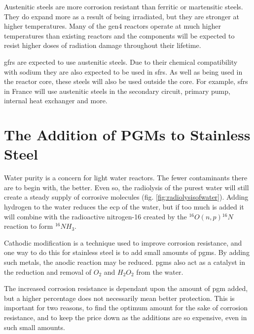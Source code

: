 Austenitic steels are more corrosion resistant than ferritic or martensitic steels.  They do expand more as a result of being irradiated, but they are stronger at higher temperatures.  Many of the \acrshort{gen4} reactors operate at much higher temperatures than existing reactors and the components will be expected to resist higher doses of radiation damage throughout their lifetime.

\acrshort{gfr}s are expected to use austenitic steels.  Due to their chemical compatibility with sodium they are also expected to be used in \acrshort{sfr}s.  As well as being used in the reactor core, these steels will also be used outside the core.  For example, \acrshort{sfr}s in France will use austenitic steels in the secondary circuit, primary pump, internal heat exchanger and more\cite{convsteelooc}.


\FloatBarrier



\section[Addition of PGMs]{The Addition of PGMs to Stainless Steel}

Water purity is a concern for light water reactors.  The fewer contaminants there are to begin with, the better.  Even so, the radiolysis of the purest water will still create a steady supply of corrosive molecules (fig. \ref{fig:radiolysisofwater}).  Adding hydrogen to the water reduces the \acrlong{ecp} of the water, but if too much is added it will combine with the radioactive nitrogen-16 created by the ${}^{16}O(n,p){}^{16}N$ reaction to form ${}^{16}NH_{3}$\cite{noblemetalchemical}.

Cathodic modification is a technique used to improve corrosion resistance, and one way to do this for stainless steel is to add small amounts of \acrfull{pgm}s\cite{potgieter1994}.  By adding such metals, the anodic reaction may be reduced.  \acrshort{pgm}s also act as a catalyst in the reduction and removal of $O_2$ and $H_2O_2$ from the water\cite{noblemetalchemical}.

The increased corrosion resistance is dependant upon the amount of \acrshort{pgm} added, but a higher percentage does not necessarily mean better protection.  This is important for two reasons, to find the optimum amount for the sake of corrosion resistance, and to keep the price down as the additions are so expensive, even in such small amounts.

